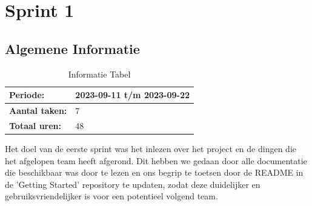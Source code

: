 \documentclass[a4paper]{report}
\begin{document}
    


\chapter{Sprint 1}
\section{Algemene Informatie}
\begin{table}[H]
\begin{tabularx}{0.6\textwidth}{|X|X|}
  \hline
  \cellcolor[HTML]{99ccff} \textbf{Periode:} & 2023-09-11 t/m 2023-09-22 \\ 
  \hline
  \cellcolor[HTML]{99ccff} \textbf{Aantal taken:} & 7 \\ 
  \hline
  \cellcolor[HTML]{99ccff} \textbf{Totaal uren:} & 48 \\ 
  \hline
\end{tabularx}
\caption{Informatie Tabel}
\label{table:it1:general}
\end{table}

Het doel van de eerste sprint was het inlezen over het project en de dingen die het afgelopen team heeft afgerond.
Dit hebben we gedaan door alle documentatie die beschikbaar was door te lezen en ons begrip te toetsen door de README in de 'Getting Started' repository te updaten, zodat deze duidelijker en gebruiksvriendelijker is voor een potentieel volgend team.
\end{document}
